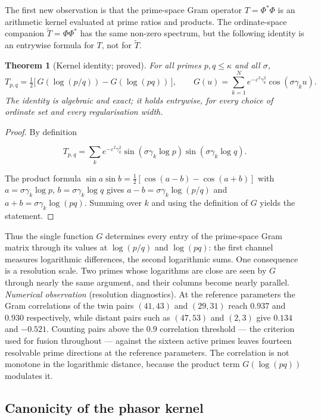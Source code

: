 \documentclass[11pt]{article}
\newtheorem{theorem}{Theorem}[section]
\newcommand{\Tt}{\widetilde{T}}
\begin{document}
The first new observation is that the prime-space Gram operator
$T=\Phi^{*}\Phi$ is an arithmetic kernel evaluated at prime ratios and
products. The ordinate-space companion $\Tt=\Phi\Phi^{*}$ has the same
non-zero spectrum, but the following identity is an entrywise formula for
$T$, not for $\Tt$.

\begin{theorem}[Kernel identity; proved]
\label{thm:kernel}
For all primes $p,q\le\kappa$ and all $\sigma$,
\[
T_{p,q}
=\tfrac12\bigl[\,G(\log(p/q))-G(\log(pq))\,\bigr],
\qquad
G(u)=\sum_{k=1}^{N}e^{-\varepsilon^2\gamma_k^2}\cos(\sigma\gamma_k u).
\]
The identity is algebraic and exact; it holds entrywise, for every choice of
ordinate set and every regularisation width.
\end{theorem}

\begin{proof}
By definition

\[
T_{p,q}=\sum_k e^{-\varepsilon^2\gamma_k^2}
\sin(\sigma\gamma_k\log p)\sin(\sigma\gamma_k\log q).
\]

The product formula
$\sin a\sin b=\tfrac12[\cos(a-b)-\cos(a+b)]$ with
$a=\sigma\gamma_k\log p$, $b=\sigma\gamma_k\log q$ gives
$a-b=\sigma\gamma_k\log(p/q)$ and $a+b=\sigma\gamma_k\log(pq)$. Summing over
$k$ and using the definition of $G$ yields the statement.
\end{proof}

Thus the single function $G$ determines every entry of the prime-space Gram
matrix through its values at $\log(p/q)$ and $\log(pq)$: the first channel
measures logarithmic differences, the second logarithmic sums. One consequence
is a resolution scale. Two primes whose logarithms are close are seen by $G$
through nearly the same argument, and their columns become nearly parallel.
\emph{Numerical observation} (resolution diagnostics). At
the reference parameters the Gram correlations of the twin pairs $(41,43)$ and
$(29,31)$ reach $0.937$ and $0.930$ respectively, while distant pairs such as
$(47,53)$ and $(2,3)$ give $0.134$ and $-0.521$. Counting pairs above the $0.9$ correlation
threshold --- the criterion used for fusion throughout --- against the
sixteen active primes leaves fourteen resolvable prime directions at the
reference parameters.
The correlation is not monotone in the logarithmic distance, because the
product term $G(\log(pq))$ modulates it.

\subsection{Canonicity of the phasor kernel}
\end{document}
